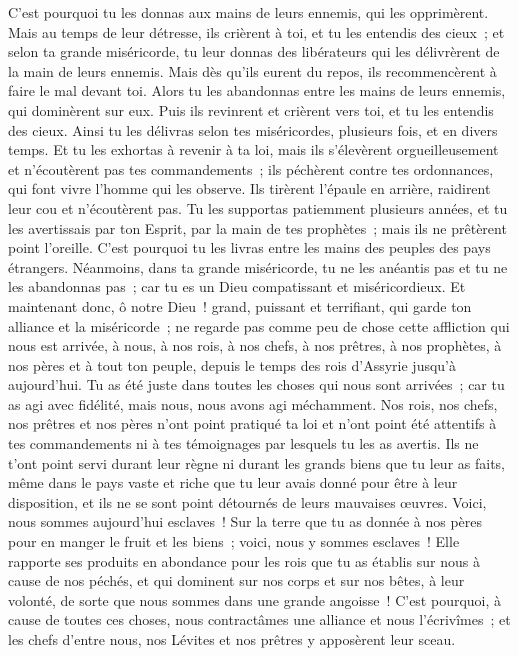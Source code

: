 \begin{multicols}{2}
C'est pourquoi tu les donnas aux mains de leurs ennemis, qui les opprimèrent. Mais au temps de leur détresse, ils crièrent à toi, et tu les entendis des cieux~; et selon ta grande miséricorde, tu leur donnas des libérateurs qui les délivrèrent de la main de leurs ennemis.
Mais dès qu'ils eurent du repos, ils recommencèrent à faire le mal devant toi. Alors tu les abandonnas entre les mains de leurs ennemis, qui dominèrent sur eux. Puis ils revinrent et crièrent vers toi, et tu les entendis des cieux. Ainsi tu les délivras selon tes miséricordes, plusieurs fois, et en divers temps.
Et tu les exhortas à revenir à ta loi, mais ils s'élevèrent orgueilleusement et n'écoutèrent pas tes commandements~; ils péchèrent contre tes ordonnances, qui font vivre l'homme qui les observe. Ils tirèrent l'épaule en arrière, raidirent leur cou et n'écoutèrent pas.
Tu les supportas patiemment plusieurs années, et tu les avertissais par ton Esprit, par la main de tes prophètes~; mais ils ne prêtèrent point l'oreille. C'est pourquoi tu les livras entre les mains des peuples des pays étrangers.
Néanmoins, dans ta grande miséricorde, tu ne les anéantis pas et tu ne les abandonnas pas~; car tu es un Dieu compatissant et miséricordieux.
Et maintenant donc, ô notre Dieu~! grand, puissant et terrifiant, qui garde ton alliance et la miséricorde~; ne regarde pas comme peu de chose cette affliction qui nous est arrivée, à nous, à nos rois, à nos chefs, à nos prêtres, à nos prophètes, à nos pères et à tout ton peuple, depuis le temps des rois d'Assyrie jusqu'à aujourd'hui.
Tu as été juste dans toutes les choses qui nous sont arrivées~; car tu as agi avec fidélité, mais nous, nous avons agi méchamment.
Nos rois, nos chefs, nos prêtres et nos pères n'ont point pratiqué ta loi et n'ont point été attentifs à tes commandements ni à tes témoignages par lesquels tu les as avertis.
Ils ne t'ont point servi durant leur règne ni durant les grands biens que tu leur as faits, même dans le pays vaste et riche que tu leur avais donné pour être à leur disposition, et ils ne se sont point détournés de leurs mauvaises œuvres.
Voici, nous sommes aujourd'hui esclaves~! Sur la terre que tu as donnée à nos pères pour en manger le fruit et les biens~; voici, nous y sommes esclaves~!
Elle rapporte ses produits en abondance pour les rois que tu as établis sur nous à cause de nos péchés, et qui dominent sur nos corps et sur nos bêtes, à leur volonté, de sorte que nous sommes dans une grande angoisse~!
C'est pourquoi, à cause de toutes ces choses, nous contractâmes une alliance et nous l'écrivîmes~; et les chefs d'entre nous, nos Lévites et nos prêtres y apposèrent leur sceau.

\end{multicols}
